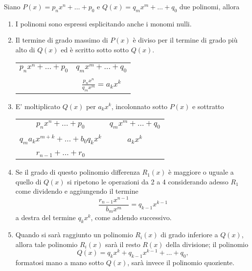 \begin{definition}\label{def:algoritmo_divisione_polinomi}
    Siano $P(x)=p_nx^n+\hdots+ p_0$ e $Q(x)=q_mx^m+\hdots+q_0$ due polinomi, allora
    \begin{enumerate}
        \item I polinomi sono espressi esplicitando anche i monomi nulli.
        \item Il termine di grado massimo di $P(x)$ è diviso per il  termine di grado più alto di $Q(x)$ ed è scritto sotto sotto $Q(x)$.\\
        \begin{tabular}{c|c}
             $ p_nx^n+\hdots+ p_0$ & $q_mx^m+\hdots+q_0$\\
             \cline{2-2}\\
            & $\frac{p_nx^n}{q_mx^m}=a_kx^k$
        \end{tabular}
        \item E' moltiplicato $Q(x)$ per $a_kx^k$, incolonnato sotto $P(x)$ e sottratto\\
        \begin{tabular}{c|c}
             $ p_nx^n+\hdots+ p_0$ & $q_mx^m+\hdots+q_0$\\
             \cline{2-2}\\
           $q_ma_kx^{m+k}+\hdots + b_0q_kx^k$ & $a_kx^k$\\
            \cline{1-1}\\
            $r_{n-1}+\hdots+r_0$&\\
        \end{tabular}
        \item Se il grado di questo polinomio differenza $R_1(x)$ è maggiore o uguale a quello di $Q(x)$ si ripetono le operazioni da 2 a 4 considerando adesso $R_1$ come dividendo e aggiungendo il termine 
        \begin{equation*}
            \frac {r_{n-1}x^{n-1}}{b_{m}x^{m}}=q_{k-1}x^{k-1}
        \end{equation*}
        a destra del termine $q_{k}x^{k}$, come addendo successivo.
        \item Quando si sarà raggiunto un polinomio $R_{i}(x)$ di grado inferiore a $Q(x)$, allora tale polinomio $R_{i}(x)$ sarà il resto $R(x)$ della divisione; il polinomio
        \begin{equation*}
             Q(x)=q_{k}x^{k}+q_{k-1}x^{k-1}+\hdots+q_{0},
        \end{equation*}
        formatosi mano a mano sotto $Q(x)$, sarà invece il polinomio quoziente. 
    \end{enumerate}
\end{definition}

